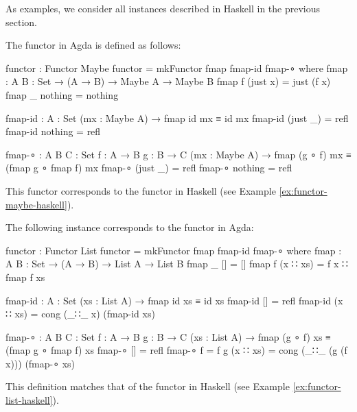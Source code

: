 As examples, we consider all instances described in Haskell in the
previous section.

\begin{example}
  \label{ex:functor-maybe-agda}

  The  functor in Agda is defined as follows:
  \begin{codeagda}
functor : Functor Maybe
functor = mkFunctor fmap fmap-id fmap-∘
  where
    fmap : {A B : Set} → (A → B) → Maybe A → Maybe B
    fmap f (just x) = just (f x)
    fmap _ nothing  = nothing

    fmap-id : {A : Set} (mx : Maybe A) → fmap id mx ≡ id mx
    fmap-id (just _) = refl
    fmap-id nothing  = refl

    fmap-∘ : {A B C : Set} {f : A → B} {g : B → C}
             (mx : Maybe A) → fmap (g ∘ f) mx ≡ (fmap g ∘ fmap f) mx
    fmap-∘ (just _) = refl
    fmap-∘ nothing  = refl
  \end{codeagda}
  This functor corresponds to the  functor in
  Haskell (see Example \ref{ex:functor-maybe-haskell}).

\end{example}

\begin{example}
  \label{ex:functor-list-agda}

  The following instance corresponds to the  functor in
  Agda:
  \begin{codeagda}
functor : Functor List
functor = mkFunctor fmap fmap-id fmap-∘
  where
    fmap : {A B : Set} → (A → B) → List A → List B
    fmap _ []       = []
    fmap f (x ∷ xs) = f x ∷ fmap f xs

    fmap-id : {A : Set} (xs : List A) → fmap id xs ≡ id xs
    fmap-id []       = refl
    fmap-id (x ∷ xs) = cong (_∷_ x) (fmap-id xs)

    fmap-∘ : {A B C : Set} {f : A → B} {g : B → C}
             (xs : List A) → fmap (g ∘ f) xs ≡ (fmap g ∘ fmap f) xs
    fmap-∘             []       = refl
    fmap-∘ {f = f} {g} (x ∷ xs) = cong (_∷_ (g (f x))) (fmap-∘ xs)
  \end{codeagda}
  This definition matches that of the \texthaskell{[]} functor in
  Haskell (see Example \ref{ex:functor-list-haskell}).

\end{example}

